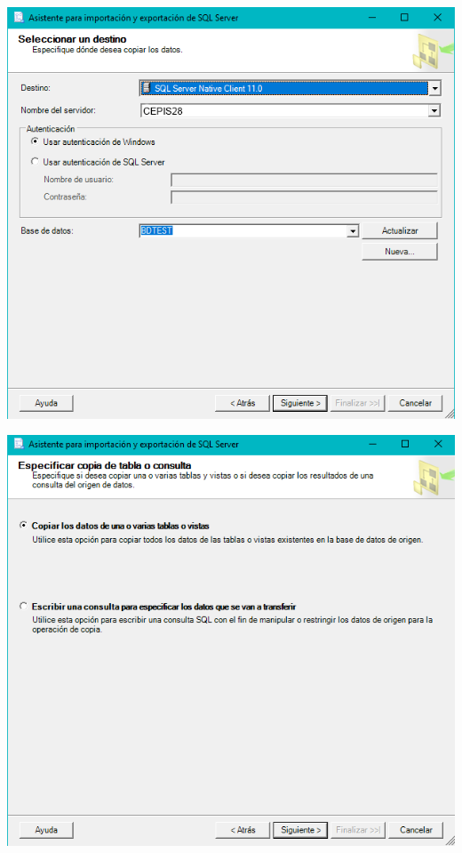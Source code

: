 	\begin{center}
	\includegraphics[width=\columnwidth]{images/task1/img5}
    \end{center}	
    
	\begin{center}
	\includegraphics[width=\columnwidth]{images/task1/img6}
    \end{center}	
    
